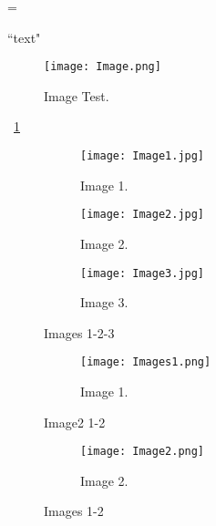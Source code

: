 
\emergencystretch=\maxdimen


``text"


\begin{figure}[h!]
	\centering
	\texttt{[image: Image.png]}
	\caption{Image Test.}
	\label{fig:image_test}
\end{figure}


\figurename{~\ref{fig:image_test}}


\begin{figure}[h]
	\centering
	\begin{subfigure}{1\textwidth}
	\texttt{[image: Image1.jpg]}
	\caption{Image 1.}
	\label{fig:image1}
	\end{subfigure}
	\begin{subfigure}{1\textwidth}
		\texttt{[image: Image2.jpg]}
		\caption{Image 2.}
		\label{fig:image2}
	\end{subfigure}
	\begin{subfigure}{1\textwidth}
		\texttt{[image: Image3.jpg]}
		\caption{Image 3.}
		\label{fig:image3}
	\end{subfigure}
	\caption{Images 1-2-3}
\end{figure}


\usepackage[export]{adjustbox}


\begin{figure}[h]
	\centering
	\begin{subfigure}[b]{0.5\textwidth}
		\texttt{[image: Images1.png]}
		\caption{Image 1.}
		\label{fig:image1}
	\end{subfigure}
	\caption{Image2 1-2}
\end{figure}
\begin{figure}\ContinuedFloat[h]
	\centering
	\begin{subfigure}[b]{0.5\textwidth}
		\texttt{[image: Image2.png]}
		\caption{Image 2.}
		\label{fig:image2}
	\end{subfigure}
	\caption{Images 1-2}
\end{figure}

